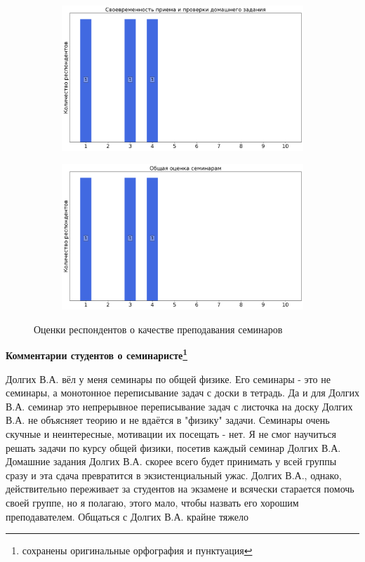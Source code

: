 \begin{figure}[H]
\begin{subfigure}[b]{0.45\textwidth}
				\includegraphics[width=\textwidth]{images/2 course/Общая физика - электричество и магнетизм/seminarists-marks-Долгих В.А.-2.png}
			\end{subfigure}
			\begin{subfigure}[b]{0.45\textwidth}
				\centering
				\includegraphics[width=\textwidth]{images/2 course/Общая физика - электричество и магнетизм/seminarists-marks-Долгих В.А.-3.png}
			\end{subfigure}	
			\caption{Оценки респондентов о качестве преподавания семинаров}
		\end{figure}

		\textbf{Комментарии студентов о семинаристе\protect\footnote{сохранены оригинальные орфография и пунктуация}}
			\begin{commentbox} 
				Долгих В.А. вёл у меня семинары по общей физике. Его семинары - это не семинары, а монотонное переписывание задач с доски в тетрадь. Да и для Долгих В.А. семинар это непрерывное переписывание задач с листочка на доску
				Долгих В.А. не объясняет теорию и не вдаётся в "физику" задачи. Семинары очень скучные и неинтересные, мотивации их посещать - нет. Я не смог научиться решать задачи по курсу общей физики, посетив каждый семинар Долгих В.А.
				Домашние задания Долгих В.А. скорее всего будет принимать у всей группы сразу и эта сдача превратится в экзистенциальный ужас. 
				Долгих В.А., однако, действительно переживает за студентов на экзамене и всячески старается помочь своей группе, но я полагаю, этого мало, чтобы назвать его хорошим преподавателем.
				Общаться с Долгих В.А. крайне тяжело 
			\end{commentbox}



